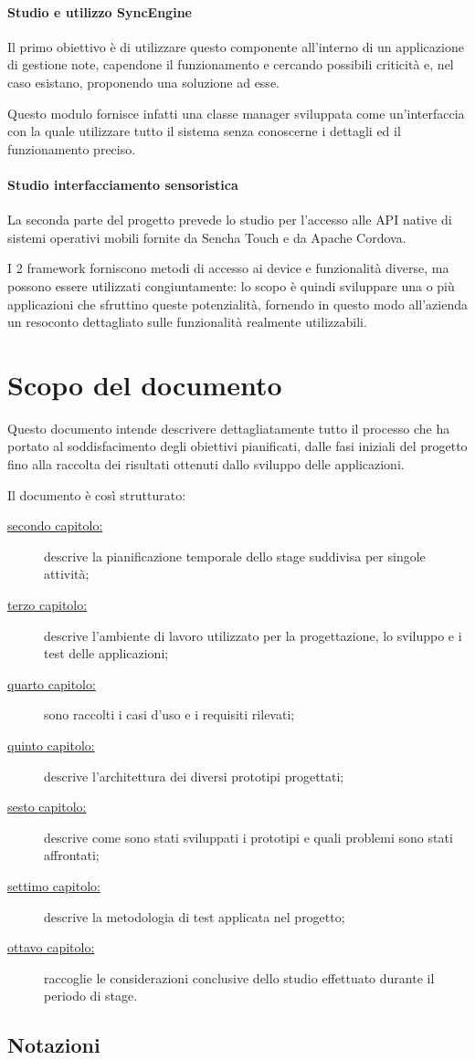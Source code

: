 \paragraph*{Studio e utilizzo SyncEngine}
Il primo obiettivo è di utilizzare questo componente all'interno di un applicazione di gestione note, capendone il funzionamento e cercando possibili criticità e, nel caso esistano, proponendo una soluzione ad esse.

Questo modulo fornisce infatti una classe manager sviluppata come un'interfaccia con la quale utilizzare tutto il sistema senza conoscerne i dettagli ed il funzionamento preciso.

\paragraph*{Studio interfacciamento sensoristica}
La seconda parte del progetto prevede lo studio per l'accesso alle \ac{API} native di sistemi operativi mobili fornite da Sencha Touch e da Apache Cordova.

I 2 framework forniscono metodi di accesso ai device e funzionalità diverse, ma possono essere utilizzati congiuntamente: lo scopo è quindi sviluppare una o più applicazioni che sfruttino queste potenzialità, fornendo in questo modo all'azienda un resoconto dettagliato sulle funzionalità realmente utilizzabili.


\section{Scopo del documento}
Questo documento intende descrivere dettagliatamente tutto il processo che ha portato al soddisfacimento degli obiettivi pianificati, dalle fasi iniziali del progetto fino alla raccolta dei risultati ottenuti dallo sviluppo delle applicazioni.

Il documento è così strutturato:
\begin{description}
\item[{\hyperref[ch:pianificazione]{secondo capitolo:}}] descrive la pianificazione temporale dello stage suddivisa per singole attività; 
\item[{\hyperref[ch:ambiente]{terzo capitolo:}}] descrive l'ambiente di lavoro utilizzato per la progettazione, lo sviluppo e i test delle applicazioni;
\item[{\hyperref[ch:requisiti]{quarto capitolo:}}] sono raccolti i casi d'uso e i requisiti rilevati;
\item[{\hyperref[ch:progettazione]{quinto capitolo:}}] descrive l'architettura dei diversi prototipi progettati;
\item[{\hyperref[ch:sviluppo]{sesto capitolo:}}] descrive come sono stati sviluppati i prototipi e quali problemi sono stati affrontati;
\item[{\hyperref[ch:test]{settimo capitolo:}}] descrive la metodologia di test applicata nel progetto;
\item[{\hyperref[ch:conclusioni]{ottavo capitolo:}}] raccoglie le considerazioni conclusive dello studio effettuato durante il periodo di stage.
\end{description}
\subsection{Notazioni}